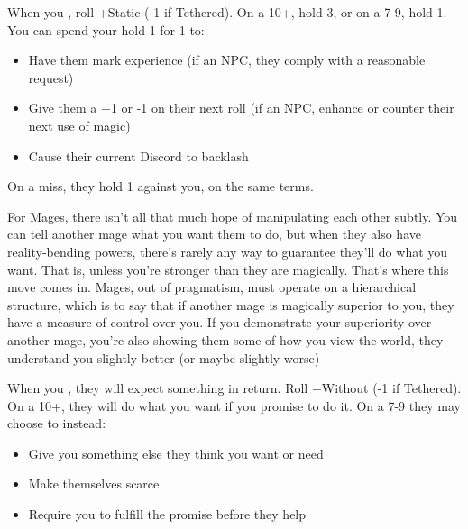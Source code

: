 



\begin{multicols}{3}

  \begin{move}
    When you , roll
    +Static (-1 if Tethered). On a 10+, hold 3, or on a 7-9, hold
    1. You can spend your hold 1 for 1 to:
    \begin{itemize}
      \setlength\itemsep{-.5em}
    \item Have them mark experience (if an NPC, they comply with a
      reasonable request)
    \item Give them a +1 or -1 on their next roll (if an NPC, enhance
      or counter their next use of magic)
    \item Cause their current Discord to backlash
    \end{itemize}
    On a miss, they hold 1 against you, on the same terms.
\begin{movedetail}
  For Mages, there isn't all that much hope of manipulating each other
  subtly. You can tell another mage what you want them to do, but when
  they also have reality-bending powers, there's rarely any way to
  guarantee they'll do what you want. That is, unless you're stronger
  than they are magically. That's where this move comes in. Mages, out
  of pragmatism, must operate on a hierarchical structure, which is to
  say that if another mage is magically superior to you, they have a
  measure of control over you. If you demonstrate your superiority
  over another mage, you're also showing them some of how you view the
  world, they understand you slightly better (or maybe slightly worse)
\end{movedetail}
  \end{move}

  \SEPARATOR

  \begin{move}
    When you , they will expect something in
    return. Roll +Without (-1 if Tethered). On a 10+, they will do
    what you want if you promise to do it. On a 7-9 they may choose to
    instead:
    \begin{itemize}
    \item Give you something else they think you want or need
    \item Make themselves scarce
    \item Require you to fulfill the promise before they help
    \end{itemize}
  \end{move}


\end{multicols}
